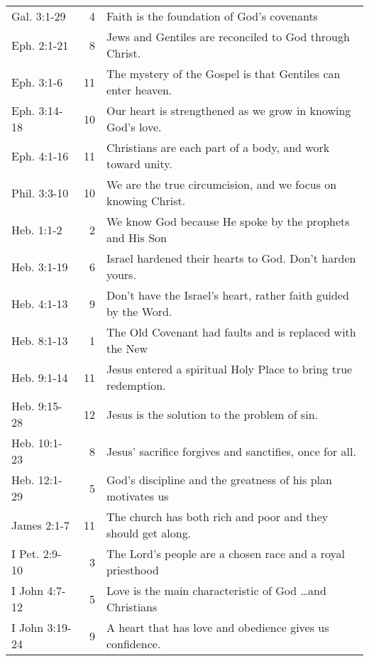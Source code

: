 \begin{table}[ht]
\begin{tabular}{lrp{11cm}}
Gal. 3:1-29     & 4  & Faith is the foundation of God's covenants\\
Eph. 2:1-21     & 8  & Jews and Gentiles are reconciled to God through Christ.\\
Eph. 3:1-6      & 11 & The mystery of the Gospel is that Gentiles can enter heaven.\\
Eph. 3:14-18    & 10 & Our heart is strengthened as we grow in knowing God's love.\\
Eph. 4:1-16     & 11 & Christians are each part of a body, and work toward unity.\\
Phil. 3:3-10    & 10 & We are the true circumcision, and we focus on knowing Christ.\\Heb. 1:1-2      & 2  & We know God because He spoke by the prophets and His Son\\
Heb. 3:1-19     & 6  & Israel hardened their hearts to God.  Don't harden yours.\\
Heb. 4:1-13     & 9  & Don't have the Israel's heart, rather faith guided by the Word.\\
Heb. 8:1-13     & 1  &  The Old Covenant had faults and is replaced with the New\\
Heb. 9:1-14     & 11 & Jesus entered a spiritual Holy Place to bring true redemption.\\
Heb. 9:15-28    & 12 & Jesus is the solution to the problem of sin.\\
Heb. 10:1-23    & 8  & Jesus' sacrifice forgives and sanctifies, once for all.\\
Heb. 12:1-29    & 5  & God's discipline and the greatness of his plan motivates us\\
James 2:1-7     & 11 & The church has both rich and poor and they should get along.\\
I Pet. 2:9-10   & 3  & The Lord's people are a chosen race and a royal priesthood\\
I John 4:7-12   & 5  & Love is the main characteristic of God \ldots and Christians\\
I John 3:19-24  & 9  & A heart that has love and obedience gives us confidence.\\
\bottomrule
\end{tabular}
\label{tab:ScriptureReferenceNT}
\end{table}
